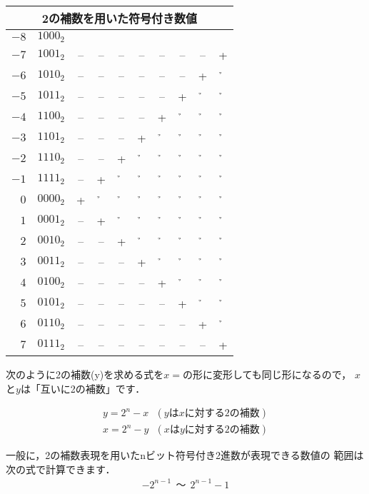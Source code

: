 \begin{center}
\begin{tabular}{ | r | l c c c c c c c c |}
\hline
\multicolumn{10}{|c|}{\bf 2の補数を用いた符号付き数値} \\
\hline
$-8$  & $1000_2$ &  &  &  &  &  &  &  &  \\
$-7$  & $1001_2$ &--&--&--&--&--&--&--&+ \\
$-6$  & $1010_2$ &--&--&--&--&--&--&+ &\h\\
$-5$  & $1011_2$ &--&--&--&--&--&+ &\h&\h\\
$-4$  & $1100_2$ &--&--&--&--&+ &\h&\h&\h\\
$-3$  & $1101_2$ &--&--&--&+ &\h&\h&\h&\h\\
$-2$  & $1110_2$ &--&--&+ &\h&\h&\h&\h&\h\\
$-1$  & $1111_2$ &--&+ &\h&\h&\h&\h&\h&\h\\
$ 0$  & $0000_2$ &+ &\h&\h&\h&\h&\h&\h&\h\\
$ 1$  & $0001_2$ &--&+ &\h&\h&\h&\h&\h&\h\\
$ 2$  & $0010_2$ &--&--&+ &\h&\h&\h&\h&\h\\
$ 3$  & $0011_2$ &--&--&--&+ &\h&\h&\h&\h\\
$ 4$  & $0100_2$ &--&--&--&--&+ &\h&\h&\h\\
$ 5$  & $0101_2$ &--&--&--&--&--&+ &\h&\h\\
$ 6$  & $0110_2$ &--&--&--&--&--&--&+ &\h\\
$ 7$  & $0111_2$ &--&--&--&--&--&--&--&+ \\
\hline
\end{tabular}
\end{center}


次のように2の補数(y)を求める式を$x=$の形に変形しても同じ形になるので，
$x$と$y$は「互いに2の補数」です．

{\small
\begin{eqnarray}
y = 2^n - x ~~~ (yはxに対する2の補数) \nonumber\\
x = 2^n - y ~~~ (xはyに対する2の補数) \nonumber
\end{eqnarray}
}


一般に，2の補数表現を用いたnビット符号付き2進数が表現できる数値の
範囲は次の式で計算できます．
{\small
\begin{eqnarray}
-2^{n-1} ~~ 〜 ~~ 2^{n-1} -1 \nonumber
\end{eqnarray}
}

